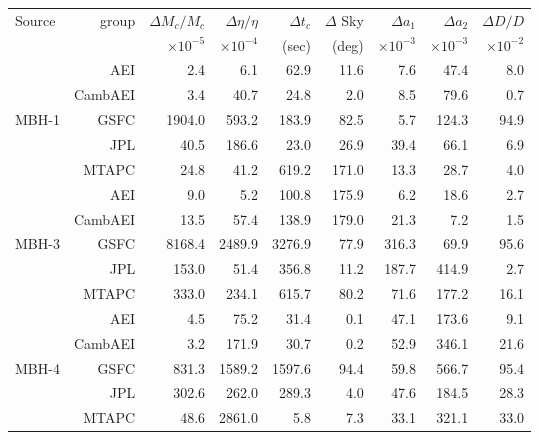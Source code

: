 \documentclass{iopart}
\begin{document}
\begin{table}
\begin{center}
\begin{tabular}{lr|rrrrrrr}
\hline
Source & group & $\Delta M_{c}/ M_{c}  $& $\Delta \eta/ \eta $ & $ \Delta t_{c} $ &  $ \Delta $ Sky  & $ \Delta a_{1} $ & $ \Delta a_{2}  $ &  $\Delta D / D$ \\
 & & $\times 10^{-5}$ & $\times 10^{-4}$ & (sec) & (deg) & $\times 10^{-3}$ & $\times 10^{-3}$ & $\times10^{-2}$   \\

\hline
             & AEI            &         2.4 &        6.1 &   62.9 &   11.6 &    7.6 &   47.4 &   8.0 \\
             & CambAEI &         3.4 &     40.7 &   24.8 &      2.0 &    8.5 &   79.6 &   0.7    \\
MBH-1 & GSFC       &  1904.0 &  593.2 & 183.9 &    82.5 &   5.7 & 124.3 &  94.9  \\
              & JPL           &       40.5 &  186.6 &   23.0 &    26.9 & 39.4 &   66.1 &    6.9  \\
              & MTAPC    &       24.8 &     41.2 & 619.2 & 171.0 & 13.3 &   28.7 &    4.0  \\

\hline
               & AEI            &       9.0 &         5.2 &    100.8 & 175.9 &      6.2 &    18.6 &   2.7  \\
               & CambAEI &     13.5 &      57.4 &    138.9 & 179.0 &    21.3 &      7.2 &   1.5 \\
MBH-3  & GSFC       & 8168.4 & 2489.9 & 3276.9 &    77.9 & 316.3 &   69.9 &  95.6 \\
               & JPL           &   153.0 &      51.4 &    356.8 &   11.2 & 187.7 & 414.9 &    2.7  \\
               & MTAPC    &   333.0 &    234.1 &    615.7 &   80.2 &    71.6 & 177.2 & 16.1  \\

\hline
                & AEI            &      4.5 &      75.2 &       31.4 &   0.1 & 47.1 &173.6  &    9.1 \\
                & CambAEI &      3.2 &    171.9 &      30.7 &   0.2 & 52.9 & 346.1 &  21.6 \\
MBH-4   & GSFC       &  831.3 & 1589.2 & 1597.6 & 94.4 & 59.8 & 566.7 & 95.4  \\
                & JPL           &  302.6 &    262.0 &   289.3 &   4.0 & 47.6 & 184.5 & 28.3  \\
                & MTAPC    &     48.6 & 2861.0 &        5.8 &   7.3 & 33.1 & 321.1 & 33.0  \\


\end{tabular}
\end{center}
\end{table}
\end{document}
